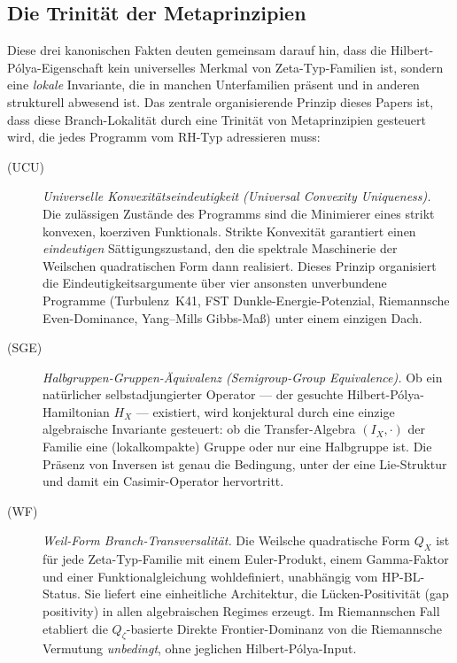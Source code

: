 \documentclass[11pt]{article}
\theoremstyle{definition}
\theoremstyle{remark}
\newcommand{\HBL}{\mathrm{HP\text{-}BL}}
\begin{document}
\subsection{Die Trinität der Metaprinzipien}
\label{sec:trinity}

Diese drei kanonischen Fakten deuten gemeinsam darauf hin, dass die Hilbert-P\'olya-Eigenschaft
kein universelles Merkmal von Zeta-Typ-Familien ist, sondern eine \emph{lokale}
Invariante, die in manchen Unterfamilien präsent und in anderen strukturell
abwesend ist. Das zentrale organisierende Prinzip dieses Papers ist,
dass diese Branch-Lokalität durch eine Trinität von Metaprinzipien gesteuert wird,
die jedes Programm vom RH-Typ adressieren muss:

\begin{description}
\item[(UCU)] \emph{Universelle Konvexitätseindeutigkeit (Universal Convexity Uniqueness).} Die zulässigen
  Zustände des Programms sind die Minimierer eines strikt konvexen,
  koerziven Funktionals. Strikte Konvexität garantiert einen \emph{eindeutigen}
  Sättigungszustand, den die spektrale Maschinerie der Weilschen quadratischen
  Form dann realisiert. Dieses Prinzip organisiert die Eindeutigkeitsargumente
  über vier ansonsten unverbundene Programme (Turbulenz~K41, FST Dunkle-Energie-Potenzial,
  Riemannsche Even-Dominance, Yang--Mills Gibbs-Maß) unter einem einzigen Dach.

\item[(SGE)] \emph{Halbgruppen-Gruppen-Äquivalenz (Semigroup-Group Equivalence).} Ob ein natürlicher
  selbstadjungierter Operator --- der gesuchte Hilbert-P\'olya-Hamiltonian
  $H_X$ --- existiert, wird konjektural durch eine einzige algebraische Invariante gesteuert:
  ob die Transfer-Algebra $(I_X, \cdot)$ der Familie eine (lokalkompakte)
  Gruppe oder nur eine Halbgruppe ist. Die Präsenz von Inversen ist genau die Bedingung,
  unter der eine Lie-Struktur und damit ein Casimir-Operator hervortritt.

\item[(WF)] \emph{Weil-Form Branch-Transversalität.} Die Weilsche quadratische Form $Q_X$ ist
  für jede Zeta-Typ-Familie mit einem Euler-Produkt, einem Gamma-Faktor und
  einer Funktionalgleichung wohldefiniert, unabhängig vom $\HBL$-Status. Sie
  liefert eine einheitliche Architektur, die Lücken-Positivität (gap positivity) in allen
  algebraischen Regimes erzeugt. Im Riemannschen Fall etabliert die
  $Q_\zeta$-basierte Direkte Frontier-Dominanz von \cite{Geiger2026RHII}
  die Riemannsche Vermutung \emph{unbedingt}, ohne jeglichen Hilbert-P\'olya-Input.
\end{description}
\end{document}

